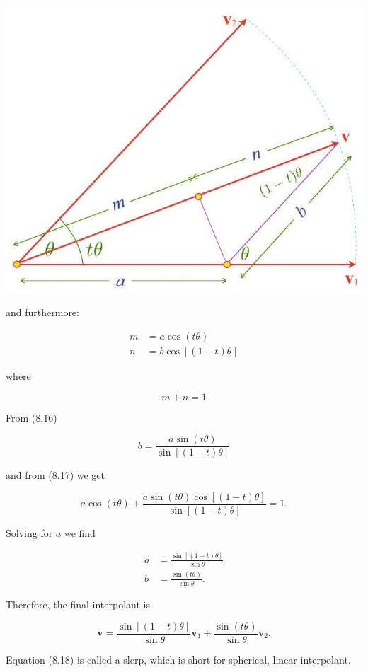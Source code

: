 \documentclass[10pt]{article}
\begin{document}
\begin{center}
\includegraphics[max width=\textwidth]{2023_04_20_41f1ceac5a31dc7d1b59g-165}
\end{center}

and furthermore:

$$
\begin{aligned}
m & =a \cos (t \theta) \\
n & =b \cos [(1-t) \theta]
\end{aligned}
$$

where

$$
m+n=1
$$

From (8.16)

$$
b=\frac{a \sin (t \theta)}{\sin [(1-t) \theta]}
$$

and from (8.17) we get

$$
a \cos (t \theta)+\frac{a \sin (t \theta) \cos [(1-t) \theta]}{\sin [(1-t) \theta]}=1 .
$$

Solving for $a$ we find

$$
\begin{aligned}
a & =\frac{\sin [(1-t) \theta]}{\sin \theta} \\
b & =\frac{\sin (t \theta)}{\sin \theta} .
\end{aligned}
$$

Therefore, the final interpolant is

$$
\mathbf{v}=\frac{\sin [(1-t) \theta]}{\sin \theta} \mathbf{v}_{1}+\frac{\sin (t \theta)}{\sin \theta} \mathbf{v}_{2} .
$$

Equation (8.18) is called a slerp, which is short for spherical, linear interpolant.
\end{document}
